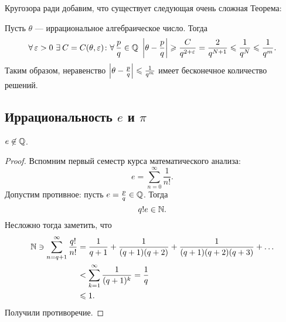 Кругозора ради добавим, что существует следующая очень сложная Теорема:

\begin{ntheorem}
\label{thm:III_Thue-Siegel-Roth}
    Пусть $\theta$ --- иррациональное алгебраическое число. Тогда 
    \[
        \forall \epsilon > 0 \ \exists C = C(\theta, \epsilon)\colon \forall \frac{p}{q} \in \QQ\ \abs{\theta - \frac{p}{q}} \ge \frac{C}{q^{2 + \epsilon}} = \frac{2}{q^{N+1}} \le \frac{1}{q^N} \le \frac{1}{q^m}.
    \]
    Таким образом, неравенство $\left| \theta - \frac{p}{q} \right| \leqslant \frac{1}{q^m}$ имеет бесконечное количество решений.
\end{ntheorem}


\subsection{\texorpdfstring{Иррациональность $e$ и $\pi$}{Иррациональность e и π}}
\label{subsec:III_E-PI-irrationality}

\begin{ntheorem}
\label{thm:III_E-irrationality}
    $e \not\in \mathbb{Q}$.
\end{ntheorem}
\begin{proof}
    Вспомним первый семестр курса математического анализа:
    \[
        e = \sum_{n=0}^{\infty} \frac{1}{n!}.
    \]
    Допустим противное: пусть $e = \frac{p}{q} \in \mathbb{Q}$. Тогда 
    \[
        q!e \in \mathbb{N}.
    \]
    Несложно тогда заметить, что 
    \begin{align*}
        \mathbb{N} \ni \sum_{n=q+1}^{\infty} \frac{q!}{n!} &= \frac{1}{q+1} + \frac{1}{(q+1)(q+2)} + \frac{1}{(q+1)(q+2)(q+3)} + \dots \\
        &< \sum_{k=1}^{\infty} \frac{1}{(q+1)^k} = \frac{1}{q} \\
        &\leqslant 1.
    \end{align*}
    Получили противоречие.
\end{proof}

